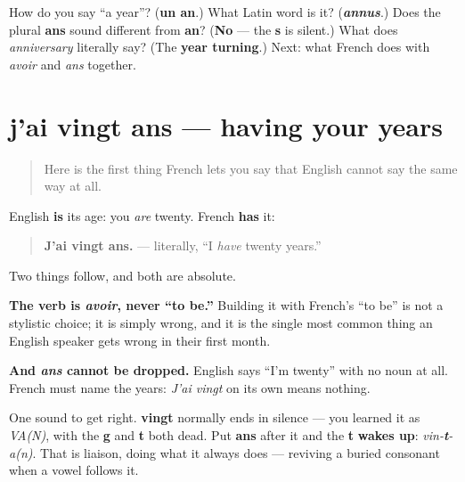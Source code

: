 \begin{tcolorbox}[breakable,colback=teal!4,colframe=teal!35!black,title={Before you move on}]
How do you say \textquotedblleft{}a year\textquotedblright{}? (\textbf{un an}.) What Latin word is it? (\emph{\textbf{annus}}.) Does the plural \textbf{ans} sound different from \textbf{an}? (\textbf{No} — the \textbf{s} is silent.) What does \emph{anniversary} literally say? (The \textbf{year turning}.) Next: what French does with \emph{avoir} and \emph{ans} together.
\end{tcolorbox}
\section[j'ai vingt ans]{j'ai vingt ans — having your years}

\label{lesson:FR-C14-jai-vingt-ans}



\begin{quote}
Here is the first thing French lets you say that English cannot say the same way at all.
\end{quote}

\begin{grammarlens}[title={Grammar Lens: age is something you have}]
English \textbf{is} its age: you \emph{are} twenty. French \textbf{has} it:

\begin{quote}
\textbf{J'ai vingt ans.} — literally, \textquotedblleft{}I \emph{have} twenty years.\textquotedblright{}
\end{quote}

Two things follow, and both are absolute.

\textbf{The verb is \emph{avoir}, never \textquotedblleft{}to be.\textquotedblright{}} Building it with French's \textquotedblleft{}to be\textquotedblright{} is not a stylistic choice; it is simply wrong, and it is the single most common thing an English speaker gets wrong in their first month.

\textbf{And \emph{ans} cannot be dropped.} English says \textquotedblleft{}I'm twenty\textquotedblright{} with no noun at all. French must name the years: \emph{J'ai vingt} on its own means nothing.

One sound to get right. \textbf{vingt} normally ends in silence — you learned it as \emph{VA(N)}, with the \textbf{g} and \textbf{t} both dead. Put \textbf{ans} after it and the \textbf{t} \textbf{wakes up}: \emph{vin-\textbf{t}-a(n)}. That is liaison, doing what it always does — reviving a buried consonant when a vowel follows it.
\end{grammarlens}

